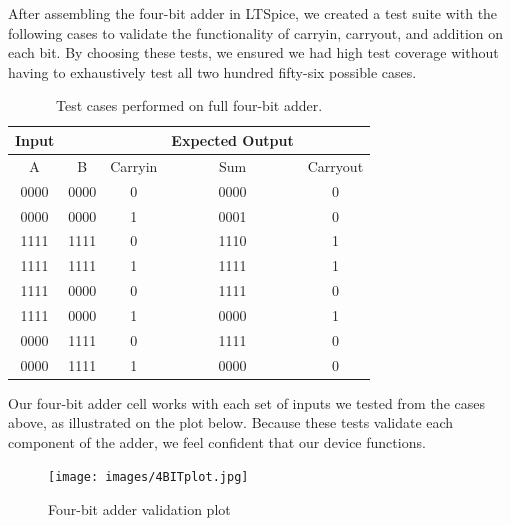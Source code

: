 \documentclass{article}
\begin{document}
After assembling the four-bit adder in LTSpice, we created a test suite with the following cases to validate the functionality of carryin, carryout, and addition on each bit. By choosing these tests, we ensured we had high test coverage without having to exhaustively test all two hundred fifty-six possible cases.
\begin{table}[H]
\begin{center}
 \begin{tabular}{|c c c | c c |} 
 \hline  
 Input &  & & Expected Output & \\
 \hline
 A & B & Carryin & Sum & Carryout\\ 
 \hline
 0000 & 0000 & 0 & 0000 & 0 \\ 
 \hline
 0000 & 0000 & 1 & 0001 & 0 \\ 
 \hline
 1111 & 1111 & 0 & 1110 & 1 \\ 
 \hline
 1111 & 1111 & 1 & 1111 & 1 \\ 
 \hline
 1111 & 0000 & 0 & 1111 & 0 \\ 
 \hline
 1111 & 0000 & 1 & 0000 & 1 \\ 
 \hline
 0000 & 1111 & 0 & 1111 & 0 \\ 
 \hline
 0000 & 1111 & 1 & 0000 & 0 \\ 
 \hline 
\end{tabular}
\caption{Test cases performed on full four-bit adder.}
\end{center}
\end{table}
Our four-bit adder cell works with each set of inputs we tested from the cases above, as illustrated on the plot below. Because these tests validate each component of the adder, we feel confident that our device functions.
\begin{figure}[H]
  \begin{center}      
  \texttt{[image: images/4BITplot.jpg]}
  \caption{Four-bit adder validation plot}   
  \label{fig:4bitplot}
  \end{center}
\end{figure}
\end{document}
